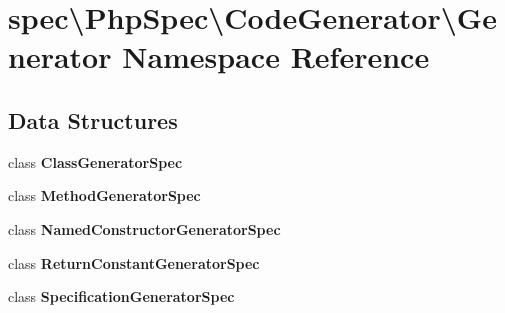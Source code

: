 \section{spec\textbackslash{}Php\+Spec\textbackslash{}Code\+Generator\textbackslash{}Generator Namespace Reference}
\label{namespacespec_1_1_php_spec_1_1_code_generator_1_1_generator}
\subsection*{Data Structures}
\begin{DoxyCompactItemize}
\item 
class {\bf Class\+Generator\+Spec}
\item 
class {\bf Method\+Generator\+Spec}
\item 
class {\bf Named\+Constructor\+Generator\+Spec}
\item 
class {\bf Return\+Constant\+Generator\+Spec}
\item 
class {\bf Specification\+Generator\+Spec}
\end{DoxyCompactItemize}
